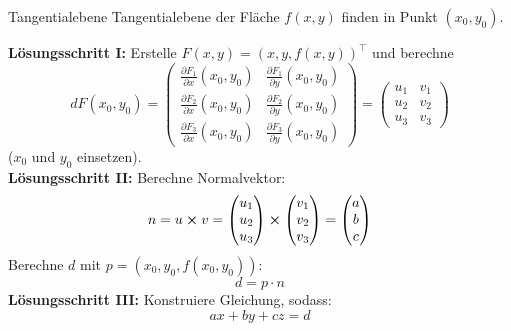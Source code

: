 \begin{Rezept}{Tangentialebene}{}
    Tangentialebene der Fläche $f(x, y)$ finden in Punkt $(x_0, y_0)$.
    
    \textbf{Lösungsschritt I:}
    Erstelle $F(x, y) = (x, y, f(x, y))^\top$ und berechne
    \[
        dF(x_0, y_0) =
            \begin{pmatrix}
                \frac{\partial F_1}{\partial x}(x_0, y_0)&\frac{\partial F_1}{\partial y}(x_0, y_0)\\
                \frac{\partial F_2}{\partial x}(x_0, y_0)&\frac{\partial F_2}{\partial y}(x_0, y_0)\\
                \frac{\partial F_3}{\partial x}(x_0, y_0)&\frac{\partial F_3}{\partial y}(x_0, y_0)
            \end{pmatrix} = 
            \begin{pmatrix}
                u_1&v_1\\
                u_2&v_2\\
                u_3&v_3
            \end{pmatrix}
    \]
    ($x_0$ und $y_0$ einsetzen).\\
    \textbf{Lösungsschritt II:}
    Berechne Normalvektor:
    \[
        n =
        u \cross v =
        \begin{pmatrix}
            u_1\\
            u_2\\
            u_3
        \end{pmatrix}
        \cross
        \begin{pmatrix}
            v_1\\
            v_2\\
            v_3
        \end{pmatrix} = 
        \begin{pmatrix}
            a\\
            b\\
            c
        \end{pmatrix}
    \]
    Berechne $d$ mit $p=(x_0,y_0,f(x_0,y_0))$:
    \[
        d=p \cdot n
    \]
    \textbf{Lösungsschritt III:} Konstruiere Gleichung, sodass:
    \[
        ax + by + cz = d
    \]
\end{Rezept}